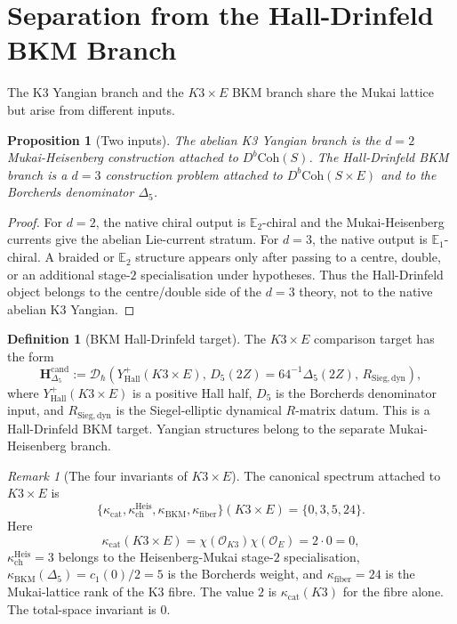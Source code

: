 \documentclass[11pt]{article}
\newtheorem{proposition}[theorem]{Proposition}
\theoremstyle{definition}
\newtheorem{definition}[theorem]{Definition}
\theoremstyle{remark}
\newtheorem{remark}[theorem]{Remark}
\newcommand{\Coh}{\mathrm{Coh}}
\newcommand{\Eone}{\mathbb{E}_1}
\newcommand{\Etwo}{\mathbb{E}_2}
\newcommand{\HD}{\mathbf{H}_{\Delta_5}^{\mathrm{cand}}}
\begin{document}
\section{Separation from the Hall-Drinfeld BKM Branch}
\label{sec:hall-drinfeld-separation}

The K3 Yangian branch and the $K3\times E$ BKM branch share the Mukai
lattice but arise from different inputs.

\begin{proposition}[Two inputs]
\label{prop:two-inputs}
The abelian K3 Yangian branch is the $d=2$ Mukai-Heisenberg
construction attached to $D^b\Coh(S)$. The Hall-Drinfeld BKM branch is
a $d=3$ construction problem attached to $D^b\Coh(S\times E)$ and to
the Borcherds denominator $\Delta_5$.
\end{proposition}

\begin{proof}
For $d=2$, the native chiral output is $\Etwo$-chiral and the
Mukai-Heisenberg currents give the abelian Lie-current stratum. For
$d=3$, the native output is $\Eone$-chiral. A braided or $\Etwo$
structure appears only after passing to a centre, double, or an
additional stage-$2$ specialisation under hypotheses. Thus the
Hall-Drinfeld object belongs to the centre/double side of the
$d=3$ theory, not to the native abelian K3 Yangian.
\end{proof}

\begin{definition}[BKM Hall-Drinfeld target]
\label{def:bkm-hall-drinfeld-target}
The $K3\times E$ comparison target has the form
\[
  \HD
  :=
  \mathcal{D}_{\hbar}\!\left(
    Y^+_{\mathrm{Hall}}(K3\times E),\,
    D_5(2Z)=64^{-1}\Delta_5(2Z),\,
    R_{\mathrm{Sieg,dyn}}
  \right),
\]
where $Y^+_{\mathrm{Hall}}(K3\times E)$ is a positive Hall half,
$D_5$ is the Borcherds denominator input, and
$R_{\mathrm{Sieg,dyn}}$ is the Siegel-elliptic dynamical
$R$-matrix datum. This is a Hall-Drinfeld BKM target. Yangian
structures belong to the separate Mukai-Heisenberg branch.
\end{definition}

\begin{remark}[The four invariants of $K3\times E$]
\label{rem:four-invariants}
The canonical spectrum attached to $K3\times E$ is
\[
  \{
    \kappa_{\mathrm{cat}},
    \kappa_{\mathrm{ch}}^{\mathrm{Heis}},
    \kappa_{\mathrm{BKM}},
    \kappa_{\mathrm{fiber}}
  \}(K3\times E)
  =
  \{0,3,5,24\}.
\]
Here
\[
  \kappa_{\mathrm{cat}}(K3\times E)
  =
  \chi(\mathcal{O}_{K3})\chi(\mathcal{O}_E)
  =
  2\cdot 0=0,
\]
$\kappa_{\mathrm{ch}}^{\mathrm{Heis}}=3$ belongs to the
Heisenberg-Mukai stage-$2$ specialisation,
$\kappa_{\mathrm{BKM}}(\Delta_5)=c_1(0)/2=5$ is the Borcherds weight,
and $\kappa_{\mathrm{fiber}}=24$ is the Mukai-lattice rank of the K3
fibre. The value $2$ is $\kappa_{\mathrm{cat}}(K3)$ for the fibre
alone. The total-space invariant is $0$.
\end{remark}
\end{document}

